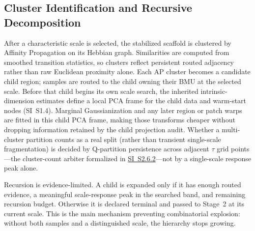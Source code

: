 \documentclass[11pt]{article}
\theoremstyle{definition}
\theoremstyle{plain}
\begin{document}
\subsection{Cluster Identification and Recursive Decomposition}
After a characteristic scale is selected, the stabilized scaffold is clustered by Affinity Propagation on its Hebbian graph. Similarities are computed from smoothed transition statistics, so clusters reflect persistent routed adjacency rather than raw Euclidean proximity alone. Each AP cluster becomes a candidate child region; samples are routed to the child owning their BMU at the selected scale. Before that child begins its own scale search, the inherited intrinsic-dimension estimates define a local PCA frame for the child data and warm-start nodes (SI~S1.4). Marginal Gaussianization and any later region or patch warps are fitted in this child PCA frame, making those transforms cheaper without dropping information retained by the child projection audit. Whether a multi-cluster partition counts as a real split (rather than transient single-scale fragmentation) is decided by Q-partition persistence across adjacent $\tau$ grid points---the cluster-count arbiter formalized in \hyperref[sec:si-feature-persistence]{SI~S2.6.2}---not by a single-scale response peak alone.

Recursion is evidence-limited. A child is expanded only if it has enough routed evidence, a meaningful scale-response peak in the searched band, and remaining recursion budget. Otherwise it is declared terminal and passed to Stage~2 at its current scale. This is the main mechanism preventing combinatorial explosion: without both samples and a distinguished scale, the hierarchy stops growing.
\end{document}
